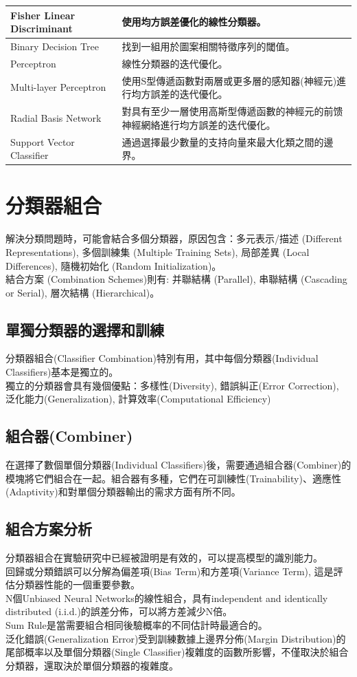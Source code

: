 \documentclass[10pt, a4paper]{article}
\begin{document}
\begin{CJK*}{UTF8}{bsmi}
\begin{longtable}{| p{4.5cm} | p{10cm} |}
    \hline
    Fisher Linear Discriminant & 使用均方誤差優化的線性分類器。 \\
    \hline
    Binary Decision Tree & 找到一組用於圖案相關特徵序列的閾值。 \\
    \hline
    Perceptron & 線性分類器的迭代優化。 \\
    \hline
    Multi-layer Perceptron & 使用S型傳遞函數對兩層或更多層的感知器(神經元)進行均方誤差的迭代優化。 \\
    \hline
    Radial Basis Network & 對具有至少一層使用高斯型傳遞函數的神經元的前馈神經網絡進行均方誤差的迭代優化。 \\
    \hline
    Support Vector Classifier & 通過選擇最少數量的支持向量來最大化類之間的邊界。 \\
    \hline
\end{longtable}

\section{分類器組合}
解決分類問題時，可能會結合多個分類器，原因包含：多元表示/描述 (Different Representations), 多個訓練集 (Multiple Training Sets), 局部差異 (Local Differences), 隨機初始化 (Random Initialization)。\\[0.5em]
結合方案 (Combination Schemes)則有: 并聯結構 (Parallel), 串聯結構 (Cascading or Serial), 層次結構 (Hierarchical)。
\subsection{單獨分類器的選擇和訓練}
分類器組合(Classifier Combination)特別有用，其中每個分類器(Individual Classifiers)基本是獨立的。\\[0.5em]
獨立的分類器會具有幾個優點：多樣性(Diversity), 錯誤糾正(Error Correction), 泛化能力(Generalization), 計算效率(Computational Efficiency)
\subsection{組合器(Combiner)}
在選擇了數個單個分類器(Individual Classifiers)後，需要通過組合器(Combiner)的模塊將它們組合在一起。組合器有多種，它們在可訓練性(Trainability)、適應性(Adaptivity)和對單個分類器輸出的需求方面有所不同。
\subsection{組合方案分析}
分類器組合在實驗研究中已經被證明是有效的，可以提高模型的識別能力。\\[0.5em]
回歸或分類錯誤可以分解為偏差項(Bias Term)和方差項(Variance Term), 這是評估分類器性能的一個重要參數。\\[0.5em]
N個Unbiased Neural Networks的線性組合，具有independent and identically distributed (i.i.d.)的誤差分佈，可以將方差減少N倍。\\[0.5em]
Sum Rule是當需要組合相同後驗概率的不同估計時最適合的。\\[0.5em]
泛化錯誤(Generalization Error)受到訓練數據上邊界分佈(Margin Distribution)的尾部概率以及單個分類器(Single Classifier)複雜度的函數所影響，不僅取決於組合分類器，還取決於單個分類器的複雜度。


\end{CJK*}
\end{document}
